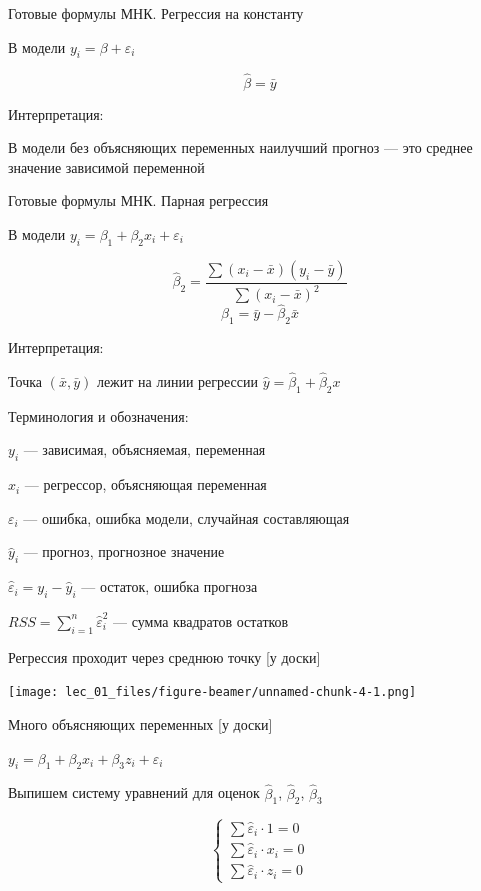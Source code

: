 \begin{frame}{Готовые формулы МНК. Регрессия на константу}

В модели \(y_i=\beta +\varepsilon_i\)

\[
\hat{\beta}=\bar{y}
\]

Интерпретация:

В модели без объясняющих переменных наилучший прогноз --- это среднее
значение зависимой переменной

\end{frame}

\begin{frame}{Готовые формулы МНК. Парная регрессия}

В модели \(y_i=\beta_1+\beta_2 x_i +\varepsilon_i\)

\[
\hat{\beta}_2=\frac{\sum (x_i-\bar{x})(y_i-\bar{y})}{\sum (x_i-\bar{x})^2}
\] \[
\hat{\beta}_1=\bar{y}-\hat{\beta}_2\bar{x}
\]

Интерпретация:

Точка \((\bar{x},\bar{y})\) лежит на линии регрессии
\(\hat{y}=\hat{\beta}_1+\hat{\beta}_2 x\)

\end{frame}

\begin{frame}{Терминология и обозначения:}

\(y_i\) --- зависимая, объясняемая, переменная

\(x_i\) --- регрессор, объясняющая переменная

\(\varepsilon_i\) --- ошибка, ошибка модели, случайная составляющая

\(\hat{y}_i\) --- прогноз, прогнозное значение

\(\hat{\varepsilon}_i=y_i-\hat{y}_i\) --- остаток, ошибка прогноза

\(RSS=\sum_{i=1}^n \hat{\varepsilon}_i^2\) --- сумма квадратов остатков

\end{frame}

\begin{frame}{Регрессия проходит через среднюю точку {[}у доски{]}}

\texttt{[image: lec\_01\_files/figure-beamer/unnamed-chunk-4-1.png]}

\end{frame}

\begin{frame}{Много объясняющих переменных {[}у доски{]}}

\(y_i=\beta_1+\beta_2 x_i +\beta_3 z_i+\varepsilon_i\)

Выпишем систему уравнений для оценок \(\hat{\beta}_1\),
\(\hat{\beta}_2\), \(\hat{\beta}_3\)

\[
\begin{cases}
\sum \hat{\varepsilon}_i \cdot 1 =0 \\
\sum \hat{\varepsilon}_i \cdot x_i =0 \\
\sum \hat{\varepsilon}_i \cdot z_i =0
\end{cases}
\]

\end{frame}

